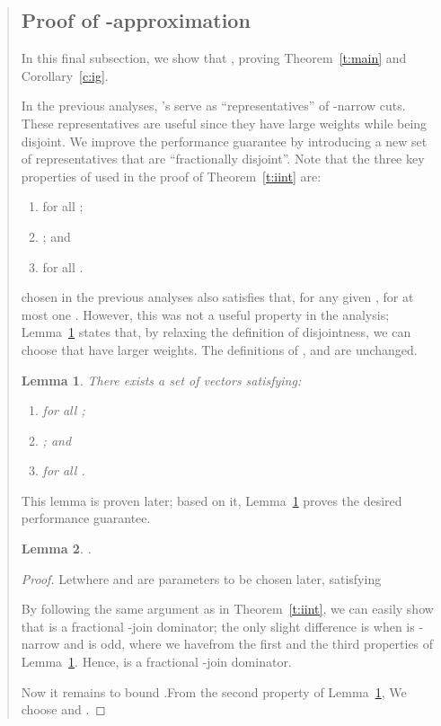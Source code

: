 \documentclass[11pt,letterpaper]{article}
\newtheorem{lemma}{Lemma}
\begin{document}
\begin{quote}
\subsection{Proof of -approximation}

In this final subsection, we show that , proving Theorem~\ref{t:main} and Corollary~\ref{c:ig}.

In the previous analyses, 's serve as ``representatives'' of -narrow cuts. These representatives are useful since they have large weights while being disjoint. We improve the performance guarantee by introducing a new set of representatives that are ``fractionally disjoint''. Note that the three key properties of  used in the proof of Theorem~\ref{t:iint} are:\begin{enumerate}
\item  for all ;
\item ; and
\item  for all .
\end{enumerate}
 chosen in the previous analyses also satisfies that, for any given ,  for at most one . However, this was not a useful property in the analysis; Lemma~\ref{l:fd} states that, by relaxing the definition of disjointness, we can choose  that have larger weights. The definitions of ,  and  are unchanged.

\begin{lemma}
\label{l:fd}
There exists a set of vectors  satisfying:\begin{enumerate}
\item  for all ;
\item ; and
\item  for all .
\end{enumerate}
\end{lemma}

This lemma is proven later; based on it, Lemma~\ref{l:fd} proves the desired performance guarantee.

\begin{lemma}\label{l:fin}
.
\end{lemma}
\begin{proof}
Letwhere  and  are parameters to be chosen later, satisfying

By following the same argument as in Theorem~\ref{t:iint}, we can easily show that  is a fractional -join dominator; the only slight difference is when  is -narrow and  is odd, where we havefrom the first and the third properties of Lemma~\ref{l:fd}. Hence,  is a fractional -join dominator.

Now it remains to bound .From the second property of Lemma~\ref{l:fd},
We choose  and .
\end{proof}


\end{quote}
\end{document}
